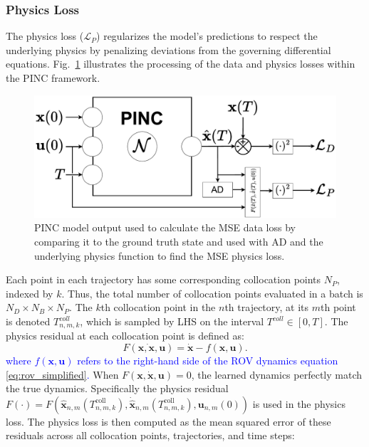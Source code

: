 \documentclass[conference]{IEEEtran}
\begin{document}
\subsubsection{Physics Loss}
The physics loss ($\mathcal{L}_P$) regularizes the model’s predictions to respect the underlying physics by penalizing deviations from the governing differential equations. Fig.~\ref{fig:pinc_loss_processing} illustrates the processing of the data and physics losses within the PINC framework.
\begin{figure}[!b]
    \centering
    \includegraphics[width=\columnwidth]{figs/block_pinc_losses.pdf}
    \caption{PINC model output used to calculate the MSE data loss by comparing it to the ground truth state and used with AD and the underlying physics function to find the MSE physics loss.}
    \label{fig:pinc_loss_processing}
\end{figure}
Each point in each trajectory has some corresponding collocation points $N_P$, indexed by $k$. Thus, the total number of collocation points evaluated in a batch is $N_D\times N_B\times N_P$. The $k$th collocation point in the $n$th trajectory, at its $m$th point is denoted $T_{n,m,k}^{coll}$, which is sampled by LHS on the interval $T^{coll}\in[0,T]$. The physics residual at each collocation point is defined as:
\begin{equation}
    \label{eq:phy_residual}
    F(\mathbf{x}\dot{,\mathbf{x}},\mathbf{u}) = \dot{\mathbf{x}} - f(\mathbf{x},\mathbf{u}).
\end{equation}
\textcolor{blue}{where $f(\mathbf{x},\mathbf{u})$ refers to the right-hand side of the ROV dynamics equation \eqref{eq:rov_simplified}.} When $F(\mathbf{x},\dot{\mathbf{x}},\mathbf{u}) =0$, the learned dynamics perfectly match the true dynamics. Specifically the physics residual $F\left(\cdot\right) = F\left(\hat{\mathbf{x}}_{n,m}(T_{n,m,k}^{\text{coll}}), \dot{\hat{\mathbf{x}}}_{n,m}(T_{n,m,k}^{\text{coll}}), \mathbf{u}_{n,m}(0)\right)$ is used in the physics loss. The physics loss is then computed as the mean squared error of these residuals across all collocation points, trajectories, and time steps: 
\end{document}
